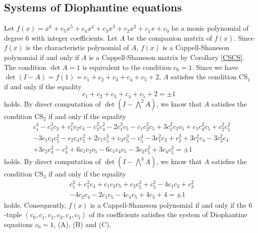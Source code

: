 \documentclass{amsart}
\theoremstyle{plain}
\theoremstyle{definition}
\theoremstyle{remark}
\begin{document}
\subsection{Systems of Diophantine equations}

Let $f(x)=x^6+c_5x^5+c_4x^4+c_3x^3+c_2x^2+c_1x+c_0$ be 
a monic polynomial of degree $6$ with integer coefficients. 
Let $A$ be the companion matrix of $f(x)$. 
Since $f(x)$ is the characteristic polynomial of $A$, $f(x)$ is a Cappell-Shaneson polynomial 
if and only if $A$ is a Cappell-Shaneson matrix by Corollary \ref{CSCS}. 
The condition $\det A=1$ is equivalent to the condition $c_0=1$. 
Since we have $\det(I-A)=f(1)=c_1+c_2+c_3+c_4+c_5+2$, 
$A$ satisfies the condition $\mathrm{CS}_1$ if and only if the equality 
\begin{equation}
c_1+c_2+c_3+c_4+c_5+2=\pm 1 \tag{A}
\end{equation}
holds. 
By direct computation of $\det(I-\bigwedge^2A)$, 
we know that $A$ satisfies the condition $\mathrm{CS}_2$ if and only if the equality 
\begin{equation}
\begin{split}
& c_1^4-c_1^3c_3+c_1^2c_2c_4-c_1^2c_4^2-2c_1^3c_5-c_1c_2^2c_5+3c_1^2c_3c_5 
+c_1c_4^2c_5+c_2^2c_5^2 \\
& -3c_1c_3c_5^2-c_2c_4c_5^2+2c_1c_5^3+c_3c_5^3-c_5^4-3c_1^2c_2+c_2^3+3c_1^2c_4-3c_2^2c_4 \\
& +3c_2c_4^2-c_4^3+6c_1c_2c_5-6c_1c_4c_5-3c_2c_5^2+3c_4c_5^2=\pm 1 
\end{split}\tag{B}
\end{equation}
holds. 
By direct computation of $\det(I-\bigwedge^3A)$, 
we know that $A$ satisfies the condition $\mathrm{CS}_3$ if and only if the equality 
\begin{equation}
\begin{split}
& c_1^3+c_1^2c_4+c_1c_3c_5+c_2c_5^2+c_5^3-4c_1c_2+c_3^2 \\
& -4c_2c_4-2c_1c_5-4c_4c_5+4c_3+4=\pm 1
\end{split}\tag{C}
\end{equation}
holds. 
Consequently, $f(x)$ is a Cappell-Shaneson polynomial if and only if the $6$-tuple 
$(c_0,c_1,c_2,c_3,c_4,c_5)$ of its coefficients satisfies the system of Diophantine equations 
$c_0=1$, (A), (B) and (C). 
\end{document}
